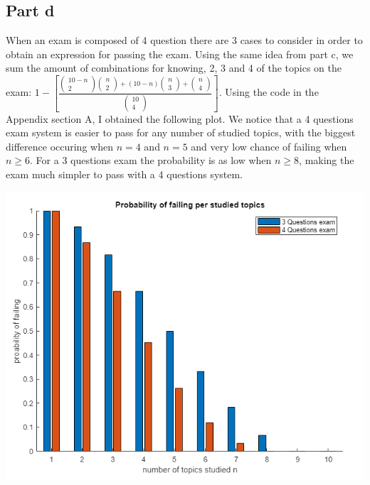 \documentclass[10pt]{article}
\begin{document}
\subsection*{Part d}
When an exam is composed of 4 question there are 3 cases to consider in order to obtain an expression for passing the exam.
Using the same idea from part c, we sum the amount of combinations for knowing, 2, 3 and 4 of the topics on the exam:
$1 - [\frac{\begin{pmatrix} 10 - n \\ 2 \end{pmatrix}\begin{pmatrix} n \\ 2 \end{pmatrix}+(10 - n)\begin{pmatrix} n \\ 3 \end{pmatrix} + \begin{pmatrix} n \\ 4 \end{pmatrix}}{\begin{pmatrix} 10 \\ 4 \end{pmatrix}}]$.
Using the code in the Appendix section A,  I obtained the following plot. We notice that
a 4 questions exam system is easier to pass for any number of studied topics, with the biggest difference
occuring when $ n = 4 $ and $ n = 5 $ and very low chance of failing when $ n \geq 6$. For a 3 questions exam the probability
is as low when $ n \geq 8 $, making the exam much simpler to pass with a 4 questions system.
\begin{center}
    \includegraphics[scale=0.4]{final_11}
\end{center}
\end{document}
